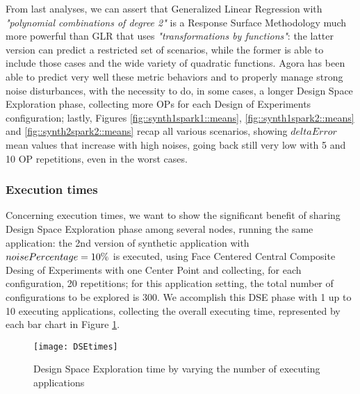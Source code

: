 From last analyses, we can assert that Generalized Linear Regression with \textit{"polynomial combinations of degree 2"} is a Response Surface Methodology much more powerful than GLR that uses \textit{"transformations by functions"}: the latter version can predict a restricted set of scenarios, while the former is able to include those cases and the wide variety of quadratic functions. Agora has been able to predict very well these metric behaviors and to properly manage strong noise disturbances, with the necessity to do, in some cases, a longer Design Space Exploration phase, collecting more OPs for each Design of Experiments configuration; lastly, Figures \ref{fig::synth1spark1::means}, \ref{fig::synth1spark2::means} and \ref{fig::synth2spark2::means} recap all various scenarios, showing $deltaError$ mean values that increase with high noises, going back still very low with 5 and 10 OP repetitions, even in the worst cases.


\subsubsection{Execution times}

Concerning execution times, we want to show the significant benefit of sharing Design Space Exploration phase among several nodes, running the same application: the 2nd version of synthetic application with $noise\-Percentage = 10\%$ is executed, using Face Centered Central Composite Desing of Experiments with one Center Point and collecting, for each configuration, 20 repetitions; for this application setting, the total number of configurations to be explored is 300. We accomplish this DSE phase with 1 up to 10 executing applications, collecting the overall executing time, represented by each bar chart in Figure \ref{fig::DSEtimes}.

\begin{figure}[htb]

    \centering
    \texttt{[image: DSEtimes]}
    \caption{Design Space Exploration time by varying the number of executing applications}
    \label{fig::DSEtimes}
    
\end{figure}

